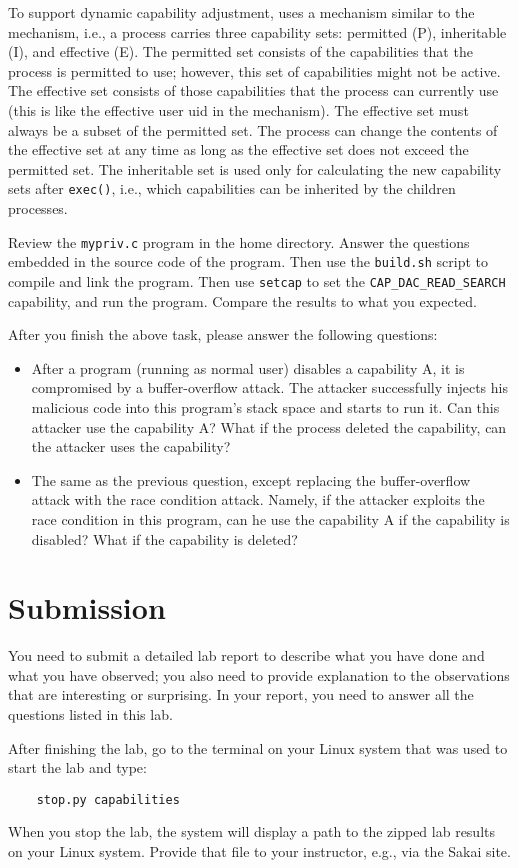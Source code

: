 To support dynamic capability adjustment, \linux uses a mechanism similar
to the \setuid mechanism, i.e., a process carries three capability sets:
permitted (P), inheritable (I), and  effective (E).
The permitted set consists of the capabilities that the process is permitted
to use; however, this set of capabilities might not be active.
The effective set consists of those capabilities that the process can currently
use (this is like the effective user uid in the \setuid mechanism).
The effective set must always be a subset of the permitted set.
The process can change the contents of the effective set at any time as long as the
effective set does not exceed the permitted set. The inheritable set is used
only for calculating the new capability sets after {\tt exec()}, i.e.,
which capabilities can be inherited by the children processes.

Review the \texttt{mypriv.c} program in the home directory.  Answer the
questions embedded in the source code of the program.  Then use the
\texttt{build.sh} script to compile and link the program. Then use \texttt{setcap}
to set the \texttt{CAP\_DAC\_READ\_SEARCH} capability, and run the program.
Compare the results to what you expected.

After you finish the above task, please answer the following questions:
\begin{itemize}
\item \myquestion After a program (running as normal user)  disables a capability A,
it is compromised
by a buffer-overflow attack. The attacker successfully injects his malicious
code into this program's stack space and starts to run it. Can this attacker use
the capability A? What if the process deleted the capability, can the attacker
uses the capability?

\item \myquestion The same as the previous question, except replacing the
buffer-overflow attack with the race condition attack. Namely, if
the attacker exploits the race condition in this program, can he use the
capability A if the capability is disabled? What if the capability is
deleted?


\end{itemize}


\section{Submission}

You need to submit a detailed lab report to describe what you have
done and what you have observed; you also need to provide explanation
to the observations that are interesting or surprising. In your report,
you need to answer all the questions listed in this lab.

After finishing the lab, go to the terminal on your Linux system that was used to start the lab and type:
\begin{verbatim}
    stop.py capabilities
\end{verbatim}
When you stop the lab, the system will display a path to the zipped lab results on your Linux system.  Provide that file to
your instructor, e.g., via the Sakai site.




